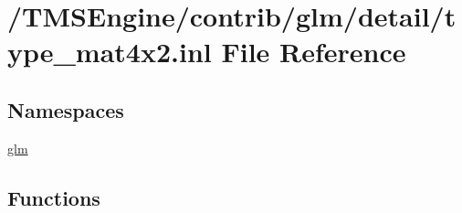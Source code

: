\hypertarget{type__mat4x2_8inl}{}\section{/\+T\+M\+S\+Engine/contrib/glm/detail/type\+\_\+mat4x2.inl File Reference}
\label{type__mat4x2_8inl}
\subsection*{Namespaces}
\begin{DoxyCompactItemize}
\item 
 \hyperlink{namespaceglm}{glm}
\end{DoxyCompactItemize}
\subsection*{Functions}
